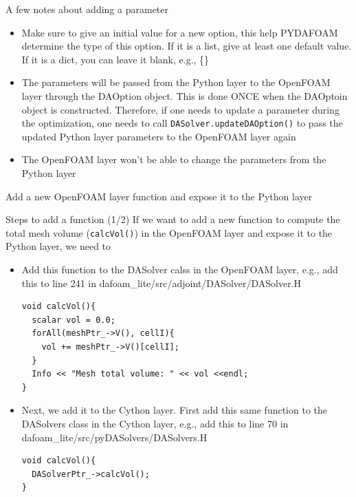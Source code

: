 \documentclass{bredelebeamer}
\begin{document}
\begin{frame}[fragile]{A few notes about adding a parameter}
\begin{itemize}
  \setlength\itemsep{0.5em}
 \item Make sure to give an initial value for a new option, this help PYDAFOAM determine the type of this
 option. If it is a list, give at least one default value. If it is a dict, you can leave it
 blank, e.g., \{\}
 \item The parameters will be passed from the Python layer to the OpenFOAM layer through the DAOption object. This is done ONCE when the DAOptoin object is constructed. Therefore, if one needs to update a parameter during the optimization, one needs to call \texttt{DASolver.updateDAOption()} to pass the updated Python layer parameters to the OpenFOAM layer again
 \item The OpenFOAM layer won't be able to change the parameters from the Python layer
\end{itemize}
\end{frame}

\begin{frame}{}
  \label{sec_add_new_func}
  \center \Large Add a new OpenFOAM layer function and expose it to the Python layer
\end{frame}

\begin{frame}[fragile]{Steps to add a function (1/2)}
If we want to add a new function to compute the total mesh volume (\texttt{calcVol()}) in the OpenFOAM layer and expose it to the Python layer, we need to
\begin{itemize}
  \setlength\itemsep{0.5em}
 \item Add this function to the DASolver calss in the OpenFOAM layer, e.g., add this to line 241 in dafoam\_lite/src/adjoint/DASolver/DASolver.H
 \footnotesize
 \lstset{ language=c++ }
 \begin{lstlisting}
void calcVol(){
  scalar vol = 0.0;
  forAll(meshPtr_->V(), cellI){
    vol += meshPtr_->V()[cellI];
  }
  Info << "Mesh total volume: " << vol <<endl;
}
 \end{lstlisting}
 \normalsize
 \item Next, we add it to the Cython layer. First add this same function to the DASolvers class in the Cython layer, e.g., add this to line 70 in dafoam\_lite/src/pyDASolvers/DASolvers.H
 \footnotesize
 \lstset{ language=c++ }
 \begin{lstlisting}
void calcVol(){
  DASolverPtr_->calcVol();
}
 \end{lstlisting}
 \normalsize
\end{itemize}
\end{frame}
\end{document}
